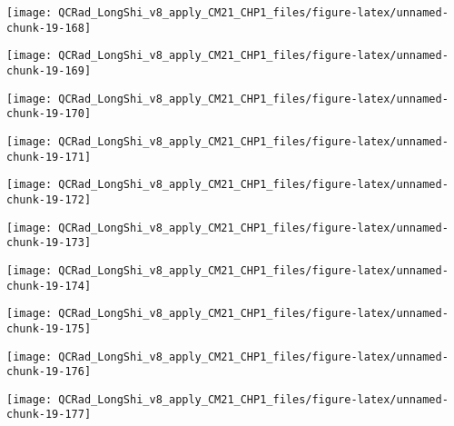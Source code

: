 \documentclass[
  10pt,
  a4paper,oneside]{article}
\begin{document}
\begin{center}\texttt{[image: QCRad\_LongShi\_v8\_apply\_CM21\_CHP1\_files/figure-latex/unnamed-chunk-19-168]} \end{center}

\begin{center}\texttt{[image: QCRad\_LongShi\_v8\_apply\_CM21\_CHP1\_files/figure-latex/unnamed-chunk-19-169]} \end{center}

\begin{center}\texttt{[image: QCRad\_LongShi\_v8\_apply\_CM21\_CHP1\_files/figure-latex/unnamed-chunk-19-170]} \end{center}

\begin{center}\texttt{[image: QCRad\_LongShi\_v8\_apply\_CM21\_CHP1\_files/figure-latex/unnamed-chunk-19-171]} \end{center}

\begin{center}\texttt{[image: QCRad\_LongShi\_v8\_apply\_CM21\_CHP1\_files/figure-latex/unnamed-chunk-19-172]} \end{center}

\begin{center}\texttt{[image: QCRad\_LongShi\_v8\_apply\_CM21\_CHP1\_files/figure-latex/unnamed-chunk-19-173]} \end{center}

\begin{center}\texttt{[image: QCRad\_LongShi\_v8\_apply\_CM21\_CHP1\_files/figure-latex/unnamed-chunk-19-174]} \end{center}

\begin{center}\texttt{[image: QCRad\_LongShi\_v8\_apply\_CM21\_CHP1\_files/figure-latex/unnamed-chunk-19-175]} \end{center}

\begin{center}\texttt{[image: QCRad\_LongShi\_v8\_apply\_CM21\_CHP1\_files/figure-latex/unnamed-chunk-19-176]} \end{center}

\begin{center}\texttt{[image: QCRad\_LongShi\_v8\_apply\_CM21\_CHP1\_files/figure-latex/unnamed-chunk-19-177]} \end{center}
\end{document}
